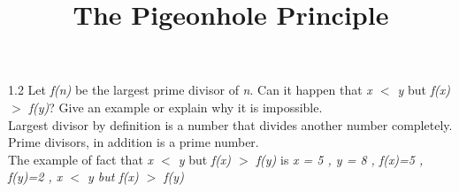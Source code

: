 \documentclass{article}
\title{The Pigeonhole Principle}
\date{}
\begin{document}
1.2 Let \emph{f(n)} be the largest prime divisor of \emph{n}. Can it happen that \emph{x $<$ y} but \emph{f(x) $>$ f(y)}? Give an example or explain why it is impossible. 
\\

Largest divisor by definition is a number that divides another number completely. Prime divisors, in addition is a prime number. 
\\

The example of fact that \emph{x $<$ y} but \emph{f(x) $>$ f(y)} is 
\emph{x = 5 , y = 8 , f(x)=5 , f(y)=2 , x $<$ y but f(x) $>$ f(y) }
\end{document}
